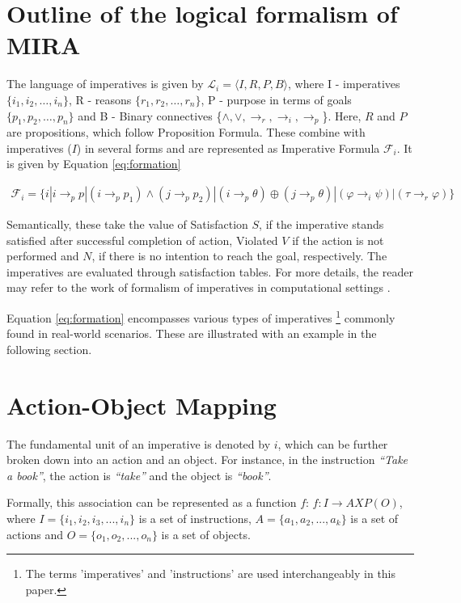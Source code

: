 \documentclass[a4paper,11pt]{lmcs}
\begin{document}
\section{Outline of the logical formalism of MIRA}
\label{sec:mira}
The language of imperatives is given by $\mathcal{L}_i = \langle I,R,P,B\rangle$, where
I - imperatives \( \{ i_1, i_2, \ldots, i_n \} \), R - reasons \( \{ r_1, r_2, \ldots, r_n \} \), P - purpose in terms of goals \( \{ p_1, p_2, \ldots, p_n \} \) and B - Binary connectives \{$\wedge,\vee, \rightarrow_r, \rightarrow_i, \rightarrow_p$\}. Here, $R$ and $P$ are propositions, which follow Proposition Formula. These combine with imperatives ($I$) in several forms and are represented as Imperative Formula $\mathcal{F}_i$. It is given by Equation \ref{eq:formation}

\begin{eqnarray}
\label{eq:formation}
 \mathcal{F}_i = \{i|i \rightarrow_p p| (i \rightarrow_p p_1) \wedge (j \rightarrow_p p_2)|(i \rightarrow_p \theta) \oplus (j \rightarrow_p \theta)|(\varphi \rightarrow_i \psi)| (\tau \rightarrow_r \varphi)
\}
\end{eqnarray}

Semantically, these take the value of Satisfaction $S$, if the imperative stands satisfied after successful completion of action, Violated $V$ if the action is not performed and $N$, if there is no intention to reach the goal, respectively. The imperatives are evaluated through satisfaction tables. For more details, the reader may refer to the work of formalism of imperatives in computational settings \cite{mira}.

Equation \ref{eq:formation} encompasses various types of imperatives \footnote{The terms 'imperatives' and 'instructions' are used interchangeably in this paper.} commonly found in real-world scenarios. These are illustrated with an example in the following section.

\section{Action-Object Mapping}
\label{sec:class}
The fundamental unit of an imperative is denoted by $i$, which can be further broken down into an action and an object.
For instance, in the instruction \textit{``Take a book''}, the action is \textit{``take''} and the object is \textit{``book''}.

Formally, this association can be represented as a function $f$:
$f:I\rightarrow A X P(O)$, where $I = \{i_1,i_2,i_3,...,i_n\}$ is a set of instructions, $A = \{a_1,a_2,...,a_k\}$ is a set of actions and $O = \{o_1,o_2,...,o_n\}$ is a set of objects.
\end{document}
